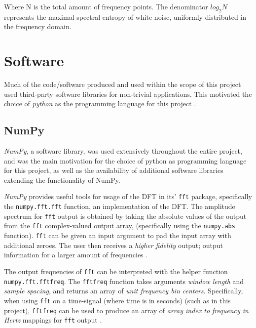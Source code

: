 \documentclass{kththesis}
\begin{document}
Where N is the total amount of frequency points.
The denominator \begin{math}log_2 N\end{math} represents the maximal spectral entropy of white noise, uniformly distributed in the frequency domain.

\section{Software}

Much of the code/software produced and used within the scope of this project used third-party software libraries for non-trivial applications. This motivated the choice of \textit{python} as the programming language for this project \parencite{Python}.

\subsection{NumPy}\label{NumPy BG}

\textit{NumPy}, a software library, was used extensively throughout the entire project, and was the main motivation for the choice of python as programming language for this project, as well as the availability of additional software libraries extending the functionality of NumPy.

\textit{NumPy} provides useful tools for usage of the DFT in its' \texttt{fft} package, specifically the \texttt{numpy.fft.fft} function, an implementation of the DFT. 
The amplitude spectrum for \texttt{fft} output is obtained by taking the absolute values of the output from the \texttt{fft} complex-valued output array, (specifically using the \texttt{numpy.abs} function).
\texttt{fft} can be given an input argument to pad the input array with additional zeroes. 
The user then receives a \textit{higher fidelity} output; output information for a larger amount of frequencies \parencite{numpy}.

The output frequencies of \texttt{fft} can be interpreted with the helper function \texttt{numpy.fft.fftfreq}. 
The \texttt{fftfreq} function takes arguments \textit{window length} and \textit{sample spacing}, and returns an array of \textit{unit frequency bin centers}. 
Specifically, when using \texttt{fft} on a time-signal (where time is in seconds) (such as in this project), \texttt{fftfreq} can be used to produce an array of \textit{array index to frequency in Hertz} mappings for \texttt{fft} output \parencite{numpy}.
\end{document}
